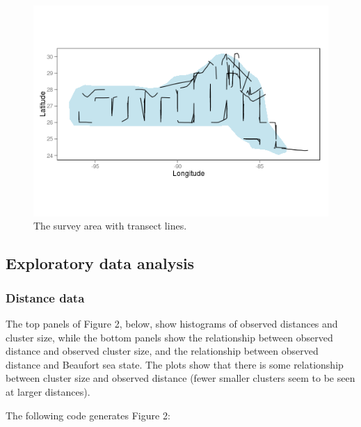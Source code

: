 \documentclass[]{amsart}
\makeatletter
\def\maxwidth{\ifdim\Gin@nat@width>\linewidth\linewidth
\else\Gin@nat@width\fi}
\let\Oldincludegraphics\includegraphics
\renewcommand{\includegraphics}[1]{\Oldincludegraphics[width=\maxwidth]{#1}}
\makeatother
\begin{document}
\begin{figure}[htbp]
\centering
\includegraphics{mexico-figs/areawithtransects.png}
\caption{The survey area with transect lines.}
\end{figure}

\subsection{Exploratory data analysis}

\subsubsection{Distance data}

The top panels of Figure 2, below, show histograms of observed distances
and cluster size, while the bottom panels show the relationship between
observed distance and observed cluster size, and the relationship
between observed distance and Beaufort sea state. The plots show that
there is some relationship between cluster size and observed distance
(fewer smaller clusters seem to be seen at larger distances).

The following code generates Figure 2:
\end{document}
